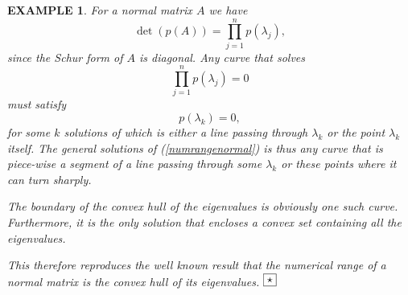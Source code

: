\documentclass[10pt,a4paper,reqno]{amsart}
\newtheorem{exa}[defi]{\bf E\scriptsize XAMPLE \normalsize}
\def\kopr{\hfill\raisebox{3pt}{\framebox{$\star$}}}
\newenvironment{example}{\begin{exa}\rm}{$\kopr$\end{exa}}
\newcommand{\zav}[1]{\left( #1 \right)}
\newcommand{\deter}[1]{\det\zav{#1}}
\begin{document}
\begin{example}
For a normal matrix $A$ we have 
$$
\deter{p(A)}=\prod_{j=1}^{n}p(\lambda_j),
$$
since the Schur form of $A$ is diagonal. 
Any curve that solves 
\begin{equation}\label{numrangenormal}
\prod_{j=1}^{n}p(\lambda_j)=0
\end{equation}
must satisfy 
$$
p(\lambda_k)=0,
$$
for some $k$ solutions of which is either a line passing through $\lambda_k$ or the point $\lambda_k$ itself.
The general solutions of (\ref{numrangenormal}) is thus any curve that is piece-wise a segment of a line passing through some $\lambda_k$ or these points where it can turn sharply.

The boundary of the convex hull of the eigenvalues is obviously one such curve. Furthermore, it is the only solution that encloses a convex set containing all the eigenvalues. 

This therefore reproduces the well known result that the numerical range of a normal matrix is the convex hull of its eigenvalues.
\end{example}
\end{document}
